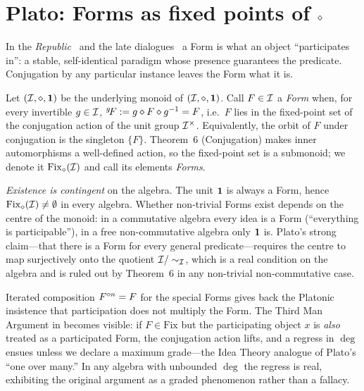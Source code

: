 \section{Plato: Forms as fixed points of $\mathbin{\diamond}$}\label{sec:plato}

 In the \emph{Republic}~\cite{PlatoRepublic} and
the late dialogues~\cite{PlatoParmenides} a Form is what an object
``participates in'': a stable, self-identical paradigm whose presence
guarantees the predicate. Conjugation by any particular instance leaves
the Form what it is.

\formalclaim Let $(\mathcal{I},\mathbin{\diamond},\mathbf{1})$ be the underlying monoid of $(\mathcal{I}, \mathbin{\diamond},
\mathbf{1})$. Call $F\in\mathcal{I}$ a \emph{Form} when, for every invertible
$g\in\mathcal{I}$, ${}^{g}\!F\mathrel{:=} g\mathbin{\diamond} F\mathbin{\diamond} g^{-1}=F$, i.e.\ $F$
lies in the fixed-point set of the conjugation action of the unit group
$\mathcal{I}^{\times}$. Equivalently, the orbit of $F$ under conjugation is the
singleton $\{F\}$. Theorem~6 (Conjugation) makes inner automorphisms a
well-defined action, so the fixed-point set is a submonoid; we denote it
$\mathrm{Fix}_{\mathbin{\diamond}}(\mathcal{I})$ and call its elements \emph{Forms}.

\formalstatus \emph{Existence is contingent} on the algebra. The unit
$\mathbf{1}$ is always a Form, hence $\mathrm{Fix}_{\mathbin{\diamond}}(\mathcal{I}) \neq
\emptyset$ in every algebra. Whether non-trivial Forms exist depends on
the centre of the monoid: in a commutative algebra every idea is a Form
(``everything is participable''), in a free non-commutative algebra only
$\mathbf{1}$ is. Plato's strong claim---that there is a Form for every general
predicate---requires the centre to map surjectively onto the quotient
$\mathcal{I}/\sim_{\mathcal{I}}$, which is a real condition on the algebra and is
ruled out by Theorem~6 in any non-trivial non-commutative case.

\litcomment Iterated composition $F^{\mathbin{\diamond} n}=F$ for the special Forms
gives back the Platonic insistence that participation does not multiply
the Form. The Third Man Argument in \cite{PlatoParmenides} becomes
visible: if $F\in\mathrm{Fix}$ but the participating object $x$ is
\emph{also} treated as a participated Form, the conjugation action lifts,
and a regress in $\deg$ ensues unless we declare a maximum grade---the
Idea Theory analogue of Plato's ``one over many.'' In any algebra with
unbounded $\deg$ the regress is real, exhibiting the original argument as
a graded phenomenon rather than a fallacy.

